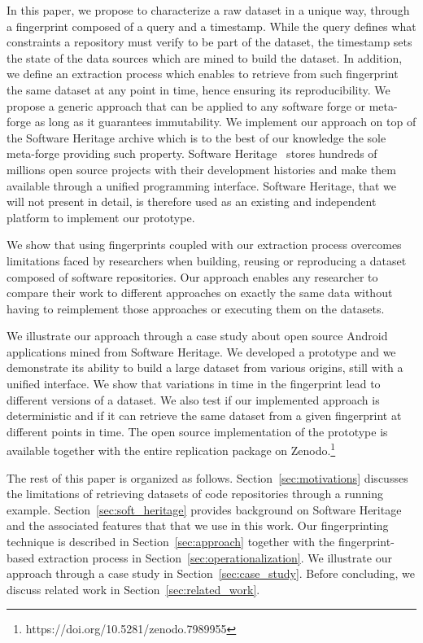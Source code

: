 In this paper, we propose to characterize a raw dataset in a unique way, through a fingerprint composed of a query and a timestamp.
While the query defines what constraints a repository must verify to be part of the dataset, the timestamp sets the state of the data sources which are mined to build the dataset. 
In addition, we define an extraction process which enables to retrieve from such fingerprint the same dataset at any point in time, hence ensuring its reproducibility.
We propose a generic approach that can be applied to any software forge or meta-forge as long as it guarantees immutability. 
We implement our approach on top of the Software Heritage archive which is to the best of our knowledge the sole meta-forge providing such property. Software Heritage~\cite{di2017software} stores hundreds of millions open source projects with their development histories and make them available through a unified programming interface.
Software Heritage, that we will not present in detail, is therefore used as an existing and independent platform to implement our prototype.

We show that using fingerprints coupled with our extraction process overcomes limitations faced by researchers when building, reusing or reproducing a dataset composed of software repositories.
Our approach enables any researcher to compare their work to different approaches on exactly the same data without having to reimplement those approaches or executing them on the datasets.

We illustrate our approach through a case study about open source Android applications mined from Software Heritage.
We developed a prototype and we demonstrate its ability to build a large dataset from various origins, still with a unified interface.
We show that variations in time in the fingerprint lead to different versions of a dataset.
We also test if our implemented approach is deterministic and if it can retrieve the same dataset from a given fingerprint at different points in time.
The open source implementation of the prototype is available together with the entire replication package on Zenodo.\footnote{https://doi.org/10.5281/zenodo.7989955}

The rest of this paper is organized as follows. Section~\ref{sec:motivations} discusses the limitations of retrieving datasets of code repositories through a running example. Section~\ref{sec:soft_heritage} provides background on Software Heritage and the associated features that that we use in this work. Our fingerprinting technique is described in Section~\ref{sec:approach} together with the fingerprint-based extraction process in Section~\ref{sec:operationalization}. We illustrate our approach through a case study in Section~\ref{sec:case_study}. Before concluding, we discuss related work in Section~\ref{sec:related_work}.

